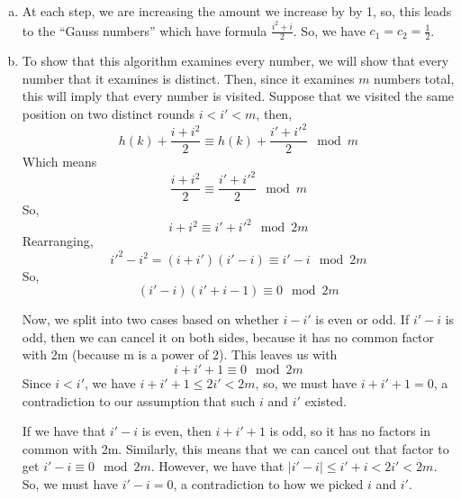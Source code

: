 \documentclass{article}
\begin{document}
\begin{enumerate}[a.]
\item
At each step, we are increasing the amount we increase by by 1, so, this leads to the ``Gauss numbers'' which have formula $\frac{i^2+i}{2}$. So, we have $c_1 = c_2 = \frac{1}{2}$.

\item

To show that this algorithm examines every number, we will show that every number that it examines is distinct. Then, since it examines $m$ numbers total, this will imply that every number is visited. Suppose that we visited the same position on two  distinct rounds $i<i'<m$, then,
\[
h(k) + \frac{i+i^2}{2} \equiv h(k) + \frac{i'+i'^2}{2} \mod m
\]
Which means
\[
 \frac{i+i^2}{2} \equiv\frac{i'+i'^2}{2} \mod m
\]
So,
\[
 i+i^2 \equiv i'+i'^2 \mod 2m
\]
Rearranging,
\[
i'^2 - i^2 = (i+i')(i'-i) \equiv  i' - i \mod 2m
\]
So,
\[
(i'-i)(i'+i-1) \equiv 0 \mod 2m
\]

Now, we split into two cases based on whether $i-i'$ is even or odd. If $i'-i$ is odd, then we can cancel it on both sides, because it has no common factor with 2m (because m is a power of 2). This leaves us with 
\[
i+i'+1 \equiv 0 \mod 2m
\]
Since $i<i'$, we have $i+i'+1 \le 2i' < 2m$, so, we must have $i+i'+1 = 0$, a contradiction to our assumption that such $i$ and $i'$ existed.

If we have that $i'-i$ is even, then $i+i'+1$ is odd, so it has no factors in common with 2m. Similarly, this means that we can cancel out that factor to get $i'-i \equiv 0 \mod 2m$. However, we have that $|i'-i| \le i'+i <2i' <2m$. So, we must have $i'-i=0$, a contradiction to how we picked $i$ and $i'$.

\end{enumerate}
\end{document}
